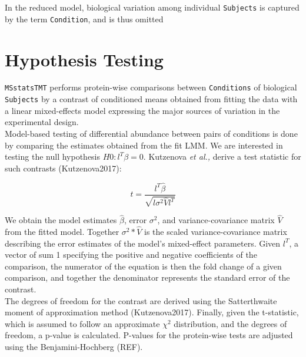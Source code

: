 \documentclass[11pt]{elife}\usepackage[]{graphicx}\usepackage[]{color}
\begin{document}
In the reduced model, biological variation among individual \texttt{Subjects} is 
captured by the term \texttt{Condition}, and is thus omitted\\


\section{Hypothesis Testing}

\texttt{MSstatsTMT} performs protein-wise
comparisons between \texttt{Conditions} of biological \texttt{Subjects} by 
a contrast of conditioned means obtained from fitting the data with a
linear mixed-effects model expressing the major sources of variation in the
experimental design.\\

Model-based testing of differential abundance between pairs of conditions
is done by comparing the estimates obtained from the fit LMM. We are interested 
in testing the null hypothesis $H0 : l^T\beta = 0$. Kutzenova \textit{et al.,}
derive a test statistic for such contrasts (Kutzenova2017):

\begin{equation}
	t = \frac{l^T \hat{\beta}}{\sqrt{l \sigma^2 \hat{V} l^T}}
\end{equation}

We obtain the model estimates $\hat{\beta}$, 
error $\sigma^2$, and
variance-covariance matrix $\hat{V}$ from the fitted model. 
Together $\sigma^2 * \hat{V}$ is the scaled variance-covariance matrix
describing the error estimates of the model's mixed-effect parameters. 
Given $l^T$, a vector of sum 1 specifying the positive and negative
coefficients of the comparison, the numerator of the equation is then
the fold change of a given comparison, and together the denominator 
represents the standard error of the contrast.\\

The degrees of freedom for the contrast are derived using the Satterthwaite
moment of approximation method (Kutzenova2017).
Finally, given the t-statistic, which is assumed to follow an approximate
$\chi^2$ distribution, and the degrees of freedom, a p-value is calculated. 
P-values for the protein-wise tests are adjusted using the
Benjamini-Hochberg (REF).\\
\end{document}
